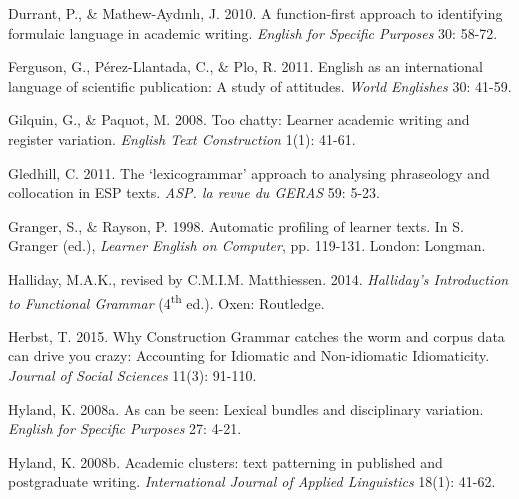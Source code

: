 \begin{styleStandard}
Durrant, P., \& Mathew-Aydınlı, J. 2010. A function-first approach to identifying formulaic language in academic writing. \textit{English for Specific Purposes} 30: 58-72. 
\end{styleStandard}

\begin{styleStandard}
Ferguson, G., Pérez-Llantada, C., \& Plo, R. 2011. English as an international language of scientific publication: A study of attitudes. \textit{World Englishes }30: 41-59.
\end{styleStandard}

\begin{styleStandard}
Gilquin, G., \& Paquot, M. 2008. Too chatty: Learner academic writing and register variation. \textit{English Text Construction }1(1): 41-61.
\end{styleStandard}

\begin{styleStandard}
Gledhill, C. 2011. The ‘lexicogrammar’ approach to analysing phraseology and collocation in ESP texts. \textit{ASP. la revue du GERAS }59: 5-23.
\end{styleStandard}

\begin{styleStandard}
Granger, S., \& Rayson, P. 1998. Automatic profiling of learner texts. In S. Granger (ed.), \textit{Learner English on Computer}, pp. 119-131. London: Longman.
\end{styleStandard}

\begin{styleStandard}
Halliday, M.A.K., revised by C.M.I.M. Matthiessen. 2014. \textit{Halliday’s Introduction to Functional Grammar }(4\textsuperscript{th} ed.). Oxen: Routledge.
\end{styleStandard}

\begin{styleStandard}
Herbst, T. 2015. Why Construction Grammar catches the worm and corpus data can drive you crazy: Accounting for Idiomatic and Non-idiomatic Idiomaticity. \textit{Journal of Social Sciences }11(3): 91-110.
\end{styleStandard}

\begin{styleStandard}
Hyland, K. 2008a. As can be seen: Lexical bundles and disciplinary variation. \textit{English for Specific Purposes }27: 4-21.
\end{styleStandard}

\begin{styleStandard}
Hyland, K. 2008b. Academic clusters: text patterning in published and postgraduate writing. \textit{International Journal of Applied Linguistics }18(1): 41-62.
\end{styleStandard}


